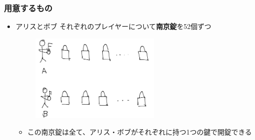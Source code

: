 \begin{frame}
  \frametitle{用意するもの}

  \begin{itemize}
    \item<+-> アリスとボブ
    それぞれのプレイヤーについて\textbf{南京錠}を52個ずつ
    \begin{figure}[h]
      \includegraphics[width=0.6\textwidth]{img/padlocks.png}
    \end{figure}
    \begin{itemize}
      \item この南京錠は全て、アリス・ボブがそれぞれに持つ1つの鍵で開錠できる
    \end{itemize}    
  \end{itemize}
\end{frame}

